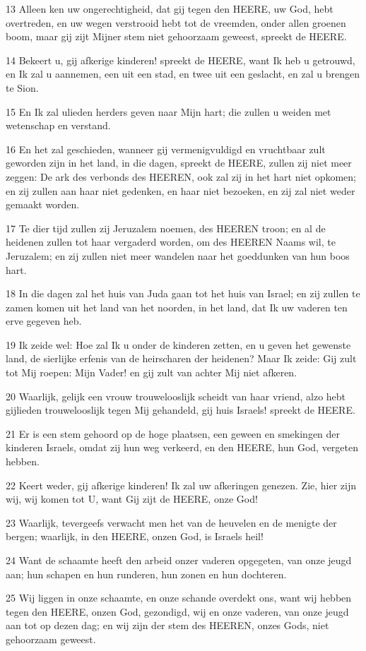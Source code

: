 \par 13 Alleen ken uw ongerechtigheid, dat gij tegen den HEERE, uw God, hebt overtreden, en uw wegen verstrooid hebt tot de vreemden, onder allen groenen boom, maar gij zijt Mijner stem niet gehoorzaam geweest, spreekt de HEERE.
\par 14 Bekeert u, gij afkerige kinderen! spreekt de HEERE, want Ik heb u getrouwd, en Ik zal u aannemen, een uit een stad, en twee uit een geslacht, en zal u brengen te Sion.
\par 15 En Ik zal ulieden herders geven naar Mijn hart; die zullen u weiden met wetenschap en verstand.
\par 16 En het zal geschieden, wanneer gij vermenigvuldigd en vruchtbaar zult geworden zijn in het land, in die dagen, spreekt de HEERE, zullen zij niet meer zeggen: De ark des verbonds des HEEREN, ook zal zij in het hart niet opkomen; en zij zullen aan haar niet gedenken, en haar niet bezoeken, en zij zal niet weder gemaakt worden.
\par 17 Te dier tijd zullen zij Jeruzalem noemen, des HEEREN troon; en al de heidenen zullen tot haar vergaderd worden, om des HEEREN Naams wil, te Jeruzalem; en zij zullen niet meer wandelen naar het goeddunken van hun boos hart.
\par 18 In die dagen zal het huis van Juda gaan tot het huis van Israel; en zij zullen te zamen komen uit het land van het noorden, in het land, dat Ik uw vaderen ten erve gegeven heb.
\par 19 Ik zeide wel: Hoe zal Ik u onder de kinderen zetten, en u geven het gewenste land, de sierlijke erfenis van de heirscharen der heidenen? Maar Ik zeide: Gij zult tot Mij roepen: Mijn Vader! en gij zult van achter Mij niet afkeren.
\par 20 Waarlijk, gelijk een vrouw trouwelooslijk scheidt van haar vriend, alzo hebt gijlieden trouwelooslijk tegen Mij gehandeld, gij huis Israels! spreekt de HEERE.
\par 21 Er is een stem gehoord op de hoge plaatsen, een geween en smekingen der kinderen Israels, omdat zij hun weg verkeerd, en den HEERE, hun God, vergeten hebben.
\par 22 Keert weder, gij afkerige kinderen! Ik zal uw afkeringen genezen. Zie, hier zijn wij, wij komen tot U, want Gij zijt de HEERE, onze God!
\par 23 Waarlijk, tevergeefs verwacht men het van de heuvelen en de menigte der bergen; waarlijk, in den HEERE, onzen God, is Israels heil!
\par 24 Want de schaamte heeft den arbeid onzer vaderen opgegeten, van onze jeugd aan; hun schapen en hun runderen, hun zonen en hun dochteren.
\par 25 Wij liggen in onze schaamte, en onze schande overdekt ons, want wij hebben tegen den HEERE, onzen God, gezondigd, wij en onze vaderen, van onze jeugd aan tot op dezen dag; en wij zijn der stem des HEEREN, onzes Gods, niet gehoorzaam geweest.

